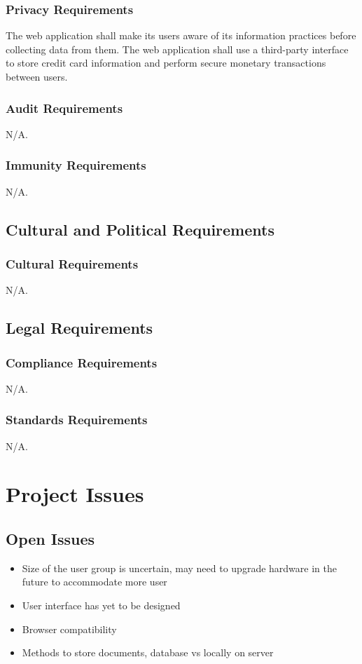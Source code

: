 \documentclass[12pt, titlepage]{article}
\begin{document}
{\subsubsection{Privacy Requirements}
The web application shall make its users aware of its information practices before collecting data from them. The web application shall use a third-party interface to store credit card information and perform secure monetary transactions between users.
\subsubsection{Audit Requirements}
N/A.
\subsubsection{Immunity Requirements}
N/A.
\subsection{Cultural and Political Requirements}
\subsubsection{Cultural Requirements}
N/A.
\subsection{Legal Requirements}
\subsubsection{Compliance Requirements}
N/A.
\subsubsection{Standards Requirements}
N/A.

\section{Project Issues}
\subsection{Open Issues}
\begin{itemize}
	\item Size of the user group is uncertain, may need to upgrade hardware in the future to accommodate more user
	\item User interface has yet to be designed
	\item Browser compatibility
	\item Methods to store documents, database vs locally on server
\end{itemize}

}
\end{document}
